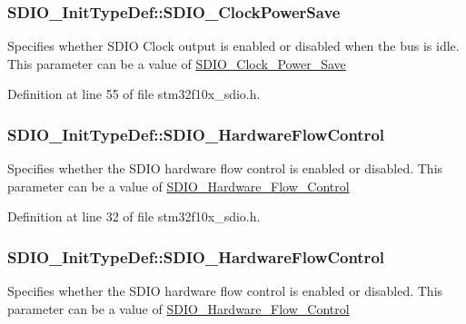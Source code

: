 \subsubsection[{\texorpdfstring{S\+D\+I\+O\+\_\+\+Clock\+Power\+Save}{SDIO_ClockPowerSave}}]{ S\+D\+I\+O\+\_\+\+Init\+Type\+Def\+::\+S\+D\+I\+O\+\_\+\+Clock\+Power\+Save}\hypertarget{struct_s_d_i_o___init_type_def_ac236cc5a376a65b9de64a31dab816364}{}\label{struct_s_d_i_o___init_type_def_ac236cc5a376a65b9de64a31dab816364}
Specifies whether S\+D\+IO Clock output is enabled or disabled when the bus is idle. This parameter can be a value of \hyperlink{group___s_d_i_o___clock___power___save}{S\+D\+I\+O\+\_\+\+Clock\+\_\+\+Power\+\_\+\+Save} 

Definition at line 55 of file stm32f10x\+\_\+sdio.\+h.

\subsubsection[{\texorpdfstring{S\+D\+I\+O\+\_\+\+Hardware\+Flow\+Control}{SDIO_HardwareFlowControl}}]{ S\+D\+I\+O\+\_\+\+Init\+Type\+Def\+::\+S\+D\+I\+O\+\_\+\+Hardware\+Flow\+Control}\hypertarget{struct_s_d_i_o___init_type_def_a6f3f4d10673f654cb14d36c0c5ed69e3}{}\label{struct_s_d_i_o___init_type_def_a6f3f4d10673f654cb14d36c0c5ed69e3}
Specifies whether the S\+D\+IO hardware flow control is enabled or disabled. This parameter can be a value of \hyperlink{group___s_d_i_o___hardware___flow___control}{S\+D\+I\+O\+\_\+\+Hardware\+\_\+\+Flow\+\_\+\+Control} 

Definition at line 32 of file stm32f10x\+\_\+sdio.\+h.

\subsubsection[{\texorpdfstring{S\+D\+I\+O\+\_\+\+Hardware\+Flow\+Control}{SDIO_HardwareFlowControl}}]{ S\+D\+I\+O\+\_\+\+Init\+Type\+Def\+::\+S\+D\+I\+O\+\_\+\+Hardware\+Flow\+Control}\hypertarget{struct_s_d_i_o___init_type_def_a5f57f8aca913de9aed47ef708c05f34f}{}\label{struct_s_d_i_o___init_type_def_a5f57f8aca913de9aed47ef708c05f34f}
Specifies whether the S\+D\+IO hardware flow control is enabled or disabled. This parameter can be a value of \hyperlink{group___s_d_i_o___hardware___flow___control}{S\+D\+I\+O\+\_\+\+Hardware\+\_\+\+Flow\+\_\+\+Control} 

